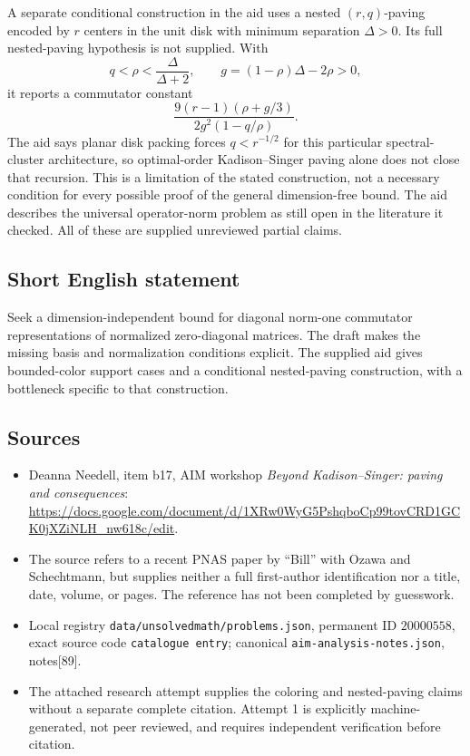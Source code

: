 \documentclass[11pt]{article}
\begin{document}
A separate conditional construction in the aid uses a nested \((r,q)\)-paving encoded by \(r\) centers in the unit disk with minimum separation \(\Delta>0\). Its full nested-paving hypothesis is not supplied. With
\[
q<\rho<\frac{\Delta}{\Delta+2},\qquad
g=(1-\rho)\Delta-2\rho>0,
\]
it reports a commutator constant
\[
\frac{9(r-1)(\rho+g/3)}{2g^2(1-q/\rho)}.
\]
The aid says planar disk packing forces \(q<r^{-1/2}\) for this particular spectral-cluster architecture, so optimal-order Kadison--Singer paving alone does not close that recursion. This is a limitation of the stated construction, not a necessary condition for every possible proof of the general dimension-free bound. The aid describes the universal operator-norm problem as still open in the literature it checked. All of these are supplied unreviewed partial claims.
\subsection{Short English statement}
Seek a dimension-independent bound for diagonal norm-one commutator representations of normalized zero-diagonal matrices. The draft makes the missing basis and normalization conditions explicit. The supplied aid gives bounded-color support cases and a conditional nested-paving construction, with a bottleneck specific to that construction.
\subsection{Sources}
\begin{itemize}
\item Deanna Needell, item b17, AIM workshop \emph{Beyond Kadison--Singer: paving and consequences}: \url{https://docs.google.com/document/d/1XRw0WyG5PshqboCp99tovCRD1GCK0jXZiNLH_nw618c/edit}.
\item The source refers to a recent PNAS paper by ``Bill'' with Ozawa and Schechtmann, but supplies neither a full first-author identification nor a title, date, volume, or pages. The reference has not been completed by guesswork.
\item Local registry \texttt{data/unsolvedmath/problems.json}, permanent ID \(20000558\), exact source code \texttt{catalogue entry}; canonical \texttt{aim-analysis-notes.json}, notes[89].
\item The attached research attempt supplies the coloring and nested-paving claims without a separate complete citation. Attempt 1 is explicitly machine-generated, not peer reviewed, and requires independent verification before citation.
\end{itemize}
\end{document}
